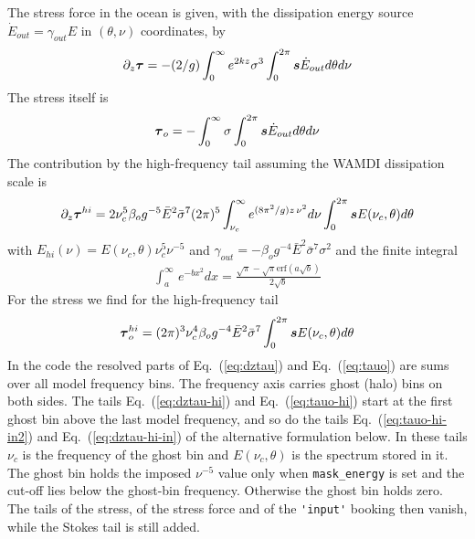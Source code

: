 \documentclass[12pt]{article}
\newcommand{\beq}  { \begin{eqnarray} }
\newcommand{\eeq}  { \end{eqnarray}}
\newcommand{\eq }  [1]{Eq.~(\ref{#1})}  %
\renewcommand{\v}[1]{{\mbox{\boldmath$ #1 $}}}  %
\newcommand{\p}{{\partial}}
\begin{document}
The stress force in the ocean is given, with the dissipation energy source
$\dot E_{out} = \gamma_{out} E$ in $(\theta,\nu)$ coordinates, by
\beq \label{eq:dztau}
 \p_z \v \tau %
 =  - (2 /g) \int_0^\infty  e^{2kz}  \sigma^3 \int_0^{2 \pi}  \v s  \dot E_{out}  d \theta d\nu 
  \eeq
The stress itself is 
\beq \label{eq:tauo}
 \v \tau_o = %
  -   \int_0^\infty\sigma   \int_0^{2 \pi}     \v s \dot E_{out}  d \theta d\nu
   \eeq 
The contribution  by the high-frequency tail assuming the WAMDI dissipation scale is
\beq \label{eq:dztau-hi}
 \p_z \v \tau^{hi}  
 =  2 \nu_c^5  \beta_{o} g^{-5}  \bar E^2 \bar \sigma^7 (2 \pi)^5 \int_{\nu_c}^\infty  e^{ (8 \pi^2/g) z  \,  \nu^2 }   d\nu
 \int_0^{2 \pi}  \v s   E(\nu_c,\theta)   d \theta 
  \eeq
   with $E_{hi}(\nu)  =   E(\nu_c,\theta) \nu_c^5 \nu^{-5}$ and 
   $\gamma_{out} = -  \beta_{o} g^{-4}  \bar E^2 \bar \sigma^7 \sigma^2 $ and the finite integral
   \beq \label{eq:erfint}
    \int_a^{\infty \:}e^{-bx^2}dx = \frac{ \sqrt{\pi }- \sqrt{\pi }\mbox{erf}\left(a\sqrt{b}\right)} { 2\sqrt{b}}
   \eeq
  For the stress we find for the high-frequency tail 
   \beq \label{eq:tauo-hi}
 \v \tau_o^{hi}  =    
  (2 \pi)^3 \nu_c^4 \beta_{o} g^{-4}  \bar E^2 \bar \sigma^7 
 \int_0^{2 \pi}     \v s   E(\nu_c,\theta)  d \theta
   \eeq
In the code the resolved parts of \eq{eq:dztau} and \eq{eq:tauo} are sums
over all model frequency bins.
The frequency axis carries ghost (halo) bins on both sides.
The tails \eq{eq:dztau-hi} and \eq{eq:tauo-hi} start at the first ghost bin
above the last model frequency, and so do the tails \eq{eq:tauo-hi-in2} and
\eq{eq:dztau-hi-in} of the alternative formulation below.
In these tails $\nu_c$ is the frequency of the ghost bin and $E(\nu_c,\theta)$
is the spectrum stored in it.
The ghost bin holds the imposed $\nu^{-5}$ value only when \verb|mask_energy|
is set and the cut-off lies below the ghost-bin frequency.
Otherwise the ghost bin holds zero.
The tails of the stress, of the stress force and of the \verb|'input'| booking
then vanish, while the Stokes tail is still added.
\end{document}

